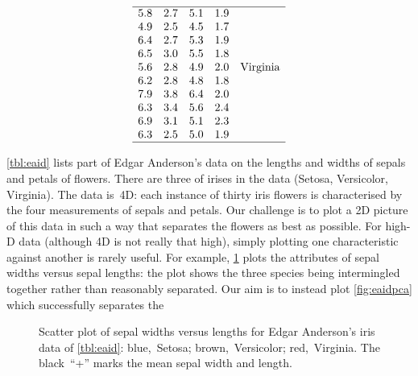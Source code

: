 \begin{example}
\begin{table}
\begin{equation*}
\begin{array}{rrrrl}
\\\hline
  5.8&2.7&5.1&1.9&
\\4.9&2.5&4.5&1.7&
\\6.4&2.7&5.3&1.9&
\\6.5&3.0&5.5&1.8&
\\5.6&2.8&4.9&2.0&\text{Virginia}
\\6.2&2.8&4.8&1.8&
\\7.9&3.8&6.4&2.0&
\\6.3&3.4&5.6&2.4&
\\6.9&3.1&5.1&2.3&
\\6.3&2.5&5.0&1.9&
\\\hline
\end{array}
\end{equation*}
\end{table}
\cref{tbl:eaid} lists part of Edgar Anderson's data on the lengths and widths of sepals and petals of  flowers.
There are three  of irises in the data (Setosa, Versicolor, Virginia).
The data is~4D: each instance of thirty iris flowers is characterised by the four measurements of sepals and petals.
Our challenge is to plot a 2D picture of this data in such a way that separates the flowers as best as possible.
For high-D data (although 4D is not really that high), simply plotting one characteristic against another is rarely useful.
For example,  \cref{fig:eaid} plots the attributes of sepal widths versus sepal lengths: the plot shows the three species being intermingled together rather than reasonably separated.
Our aim is to instead plot \cref{fig:eaidpca} which successfully separates the 

\begin{figure}
\centering
{}
\caption{Scatter plot of sepal widths versus lengths for Edgar Anderson's iris data of \cref{tbl:eaid}: blue,~Setosa; brown,~Versicolor; red,~Virginia.  
The black~``+'' marks the mean sepal width and length.}
\label{fig:eaid}
\end{figure}


\end{example}

